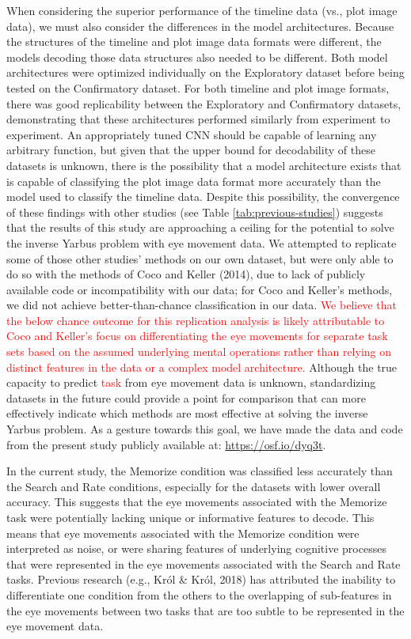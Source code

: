 \documentclass[
  english,
  man, donotrepeattitle,floatsintext]{apa6}
\begin{document}
When considering the superior performance of the timeline data (vs., plot image data), we must also consider the differences in the model architectures. Because the structures of the timeline and plot image data formats were different, the models decoding those data structures also needed to be different. Both model architectures were optimized individually on the Exploratory dataset before being tested on the Confirmatory dataset. For both timeline and plot image formats, there was good replicability between the Exploratory and Confirmatory datasets, demonstrating that these architectures performed similarly from experiment to experiment. An appropriately tuned CNN should be capable of learning any arbitrary function, but given that the upper bound for decodability of these datasets is unknown, there is the possibility that a model architecture exists that is capable of classifying the plot image data format more accurately than the model used to classify the timeline data. Despite this possibility, the convergence of these findings with other studies (see Table \ref{tab:previous-studies}) suggests that the results of this study are approaching a ceiling for the potential to solve the inverse Yarbus problem with eye movement data. We attempted to replicate some of those other studies' methods on our own dataset, but were only able to do so with the methods of Coco and Keller (2014), due to lack of publicly available code or incompatibility with our data; for Coco and Keller's methods, we did not achieve better-than-chance classification in our data. \textcolor{red}{We believe that the below chance outcome for this replication analysis is likely attributable to Coco and Keller's focus on differentiating the eye movements for separate task sets based on the assumed underlying mental operations rather than relying on distinct features in the data or a complex model architecture.} Although the true capacity to predict \textcolor{red}{task} from eye movement data is unknown, standardizing datasets in the future could provide a point for comparison that can more effectively indicate which methods are most effective at solving the inverse Yarbus problem. As a gesture towards this goal, we have made the data and code from the present study publicly available at: \url{https://osf.io/dyq3t}.

In the current study, the Memorize condition was classified less accurately than the Search and Rate conditions, especially for the datasets with lower overall accuracy. This suggests that the eye movements associated with the Memorize task were potentially lacking unique or informative features to decode. This means that eye movements associated with the Memorize condition were interpreted as noise, or were sharing features of underlying cognitive processes that were represented in the eye movements associated with the Search and Rate tasks. Previous research (e.g., Król \& Król, 2018) has attributed the inability to differentiate one condition from the others to the overlapping of sub-features in the eye movements between two tasks that are too subtle to be represented in the eye movement data.
\end{document}

